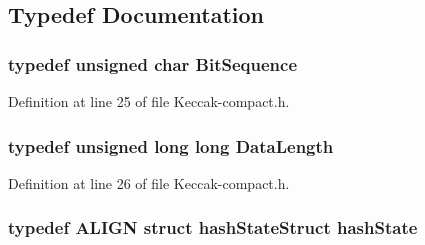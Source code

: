 \subsection{Typedef Documentation}
\hypertarget{Keccak-compact_8h_ac7449f64e35526a4e70f37cbc40ecc65}{
\subsubsection[{Bit\-Sequence}]{\setlength{\rightskip}{0pt plus 5cm}typedef unsigned char {\bf Bit\-Sequence}}}\label{Keccak-compact_8h_ac7449f64e35526a4e70f37cbc40ecc65}


Definition at line 25 of file Keccak-\/compact.\-h.

\hypertarget{Keccak-compact_8h_aa1c06fb4773a4b043c077daf86fb9d87}{
\subsubsection[{Data\-Length}]{\setlength{\rightskip}{0pt plus 5cm}typedef unsigned long long {\bf Data\-Length}}}\label{Keccak-compact_8h_aa1c06fb4773a4b043c077daf86fb9d87}


Definition at line 26 of file Keccak-\/compact.\-h.

\hypertarget{Keccak-compact_8h_a6cd75f9e7106362b1576ff73d4cc6a3b}{
\subsubsection[{hash\-State}]{\setlength{\rightskip}{0pt plus 5cm}typedef {\bf A\-L\-I\-G\-N} struct {\bf hash\-State\-Struct}  {\bf hash\-State}}}\label{Keccak-compact_8h_a6cd75f9e7106362b1576ff73d4cc6a3b}


